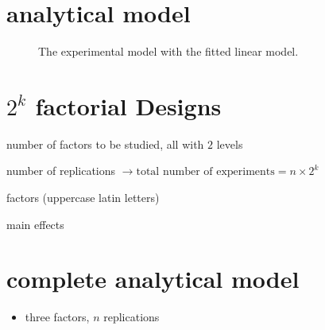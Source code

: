 \documentclass[
  a4paper,
]{scrbook}
\providecommand{\tightlist}{%
  \setlength{\itemsep}{0pt}\setlength{\parskip}{0pt}}\usepackage{longtable,booktabs,array}
\let\olddescription\description
\let\endolddescription\enddescription
\renewenvironment{description}{
          \begin{spacing}{1.5}\olddescription
        }{
          \endolddescription\end{spacing}
        }
\begin{document}
\section{analytical model}\label{analytical-model}

\begin{figure}[ht]


\caption{\label{fig-ana-mdl}The experimental model with the fitted
linear model.}

\end{figure}%

\section{\texorpdfstring{\(2^k\) factorial
Designs}{2\^{}k factorial Designs}}\label{k-factorial-designs}

\begin{description}
\item[\(k\)]
number of factors to be studied, all with \(2\) levels
\item[\(n\)]
number of replications
\(\rightarrow \text{total number of experiments} = n \times 2^k\)
\item[\(A,B, \ldots\)]
factors (uppercase latin letters)
\item[\(\alpha, \beta, \ldots\)]
main effects
\end{description}

\section{complete analytical model}\label{complete-analytical-model}

\begin{itemize}
\tightlist
\item
  three factors, \(n\) replications
\end{itemize}
\end{document}
